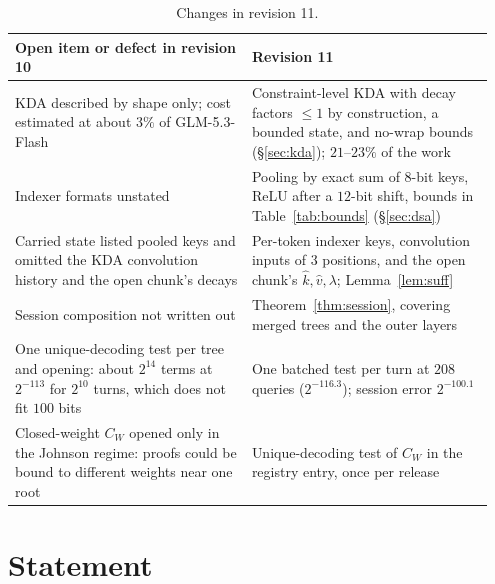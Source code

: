 \documentclass[11pt]{article}
\begin{document}
\begin{table}[h]
\centering\small
\begin{tabular}{@{}p{0.47\linewidth}p{0.48\linewidth}@{}}
\toprule
Open item or defect in revision 10 & Revision 11 \\
\midrule
KDA described by shape only; cost estimated at about \(3\%\) of GLM-5.3-Flash & Constraint-level KDA with decay factors \(\le 1\) by construction, a bounded state, and no-wrap bounds (\S\ref{sec:kda}); \(21\)--\(23\%\) of the work \\
Indexer formats unstated & Pooling by exact sum of \(8\)-bit keys, ReLU after a \(12\)-bit shift, bounds in Table~\ref{tab:bounds} (\S\ref{sec:dsa}) \\
Carried state listed pooled keys and omitted the KDA convolution history and the open chunk's decays & Per-token indexer keys, convolution inputs of \(3\) positions, and the open chunk's \(\hat k, \hat v, \lambda\); Lemma~\ref{lem:suff} \\
Session composition not written out & Theorem~\ref{thm:session}, covering merged trees and the outer layers \\
One unique-decoding test per tree and opening: about \(2^{14}\) terms at \(2^{-113}\) for \(2^{10}\) turns, which does not fit \(100\) bits & One batched test per turn at \(208\) queries (\(2^{-116.3}\)); session error \(2^{-100.1}\) \\
Closed-weight \(C_W\) opened only in the Johnson regime: proofs could be bound to different weights near one root & Unique-decoding test of \(C_W\) in the registry entry, once per release \\
\bottomrule
\end{tabular}
\caption{Changes in revision 11.}
\label{tab:rev11}
\end{table}

\section{Statement}
\label{sec:statement}
\end{document}
